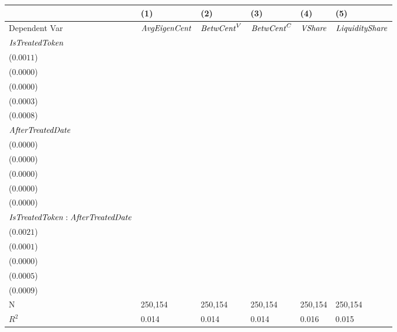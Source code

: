 \begin{tabular}{llllll}
\toprule
{} &                                      (1) &                                      (2) &                                      (3) &                                      (4) &                                       (5) \\
\midrule
Dependent Var                                 &                     ${\it AvgEigenCent}$ &                       ${\it BetwCent}^V$ &                       ${\it BetwCent}^C$ &                           ${\it VShare}$ &                    ${\it LiquidityShare}$ \\
${\it IsTreatedToken}$                        &  \makecell{$0.0138^{***}$ \\ ($0.0011$)} &  \makecell{$0.0003^{***}$ \\ ($0.0000$)} &  \makecell{$0.0001^{***}$ \\ ($0.0000$)} &  \makecell{$0.0037^{***}$ \\ ($0.0003$)} &   \makecell{$0.0093^{***}$ \\ ($0.0008$)} \\
${\it AfterTreatedDate}$                      &  \makecell{$0.0020^{***}$ \\ ($0.0000$)} &  \makecell{$0.0000^{***}$ \\ ($0.0000$)} &  \makecell{$0.0000^{***}$ \\ ($0.0000$)} &  \makecell{$0.0005^{***}$ \\ ($0.0000$)} &   \makecell{$0.0008^{***}$ \\ ($0.0000$)} \\
${\it IsTreatedToken}:{\it AfterTreatedDate}$ &   \makecell{$0.0046^{**}$ \\ ($0.0021$)} &    \makecell{$-0.0000^{}$ \\ ($0.0001$)} &   \makecell{$-0.0000^{*}$ \\ ($0.0000$)} &   \makecell{$0.0012^{**}$ \\ ($0.0005$)} &  \makecell{$-0.0024^{***}$ \\ ($0.0009$)} \\
\midrule N                                    &                                  250,154 &                                  250,154 &                                  250,154 &                                  250,154 &                                   250,154 \\
$R^2$                                         &                                    0.014 &                                    0.014 &                                    0.014 &                                    0.016 &                                     0.015 \\
\bottomrule
\end{tabular}
